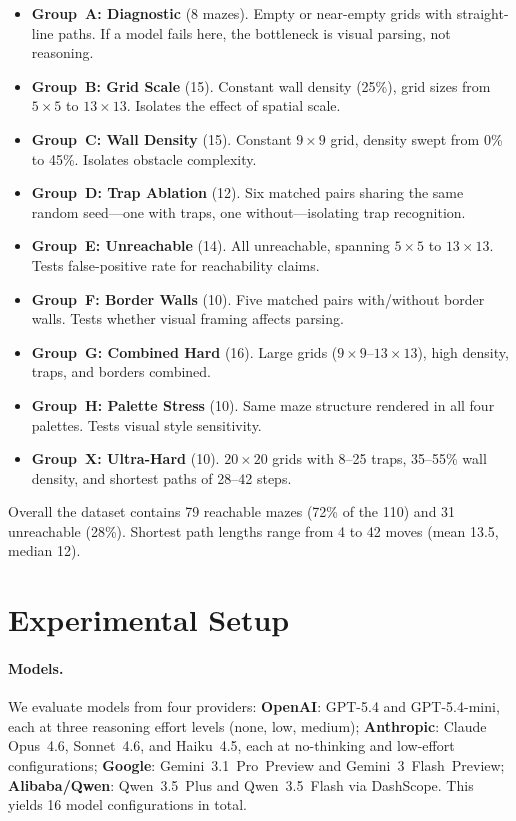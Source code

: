\documentclass[11pt]{article}
\begin{document}
\begin{itemize}
\itemsep0em
\item \textbf{Group~A: Diagnostic} (8 mazes). Empty or near-empty grids with straight-line paths. If a model fails here, the bottleneck is visual parsing, not reasoning.
\item \textbf{Group~B: Grid Scale} (15). Constant wall density (25\%), grid sizes from $5 \times 5$ to $13 \times 13$. Isolates the effect of spatial scale.
\item \textbf{Group~C: Wall Density} (15). Constant $9 \times 9$ grid, density swept from 0\% to 45\%. Isolates obstacle complexity.
\item \textbf{Group~D: Trap Ablation} (12). Six matched pairs sharing the same random seed---one with traps, one without---isolating trap recognition.
\item \textbf{Group~E: Unreachable} (14). All unreachable, spanning $5 \times 5$ to $13 \times 13$. Tests false-positive rate for reachability claims.
\item \textbf{Group~F: Border Walls} (10). Five matched pairs with/without border walls. Tests whether visual framing affects parsing.
\item \textbf{Group~G: Combined Hard} (16). Large grids ($9 \times 9$--$13 \times 13$), high density, traps, and borders combined.
\item \textbf{Group~H: Palette Stress} (10). Same maze structure rendered in all four palettes. Tests visual style sensitivity.
\item \textbf{Group~X: Ultra-Hard} (10). $20 \times 20$ grids with 8--25 traps, 35--55\% wall density, and shortest paths of 28--42 steps.
\end{itemize}

Overall the dataset contains 79 reachable mazes (72\% of the 110) and 31 unreachable (28\%).
Shortest path lengths range from 4 to 42 moves (mean 13.5, median 12).


\section{Experimental Setup}
\label{sec:setup}

\paragraph{Models.}
We evaluate models from four providers:
\textbf{OpenAI}: GPT-5.4 and GPT-5.4-mini, each at three reasoning effort levels (none, low, medium);
\textbf{Anthropic}: Claude Opus~4.6, Sonnet~4.6, and Haiku~4.5, each at no-thinking and low-effort configurations;
\textbf{Google}: Gemini~3.1~Pro~Preview and Gemini~3~Flash~Preview;
\textbf{Alibaba/Qwen}: Qwen~3.5~Plus and Qwen~3.5~Flash via DashScope.
This yields 16 model configurations in total.
\end{document}
